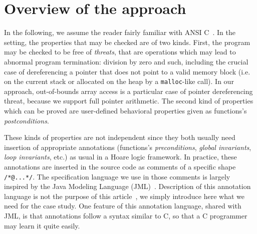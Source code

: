 \section{Overview of the \caduceus{} approach}
\label{sec:overview}

In the following, we assume the reader fairly familiar with ANSI
C~\cite{KR88}.  In the \caduceus{} setting, the properties that may be
checked are of two kinds. First, the program may be checked to be free
of \emph{threats}, that are operations which may lead to abnormal
program termination: division by zero and such, including the crucial
case of dereferencing a pointer that does not point to a valid memory
block (i.e. on the current stack or allocated on the heap by a
\texttt{malloc}-like call). In our approach, out-of-bounds array
access is a particular case of pointer dereferencing threat, because
we support full pointer arithmetic.  The second kind of properties
which can be proved are user-defined behavioral properties given as
functions's \emph{postconditions}.

These kinds of properties are not independent since they both usually
need insertion of appropriate annotations (functions's
\emph{preconditions}, \emph{global invariants}, \emph{loop
  invariants}, etc.) as usual in a Hoare logic framework.  In
practice, these annotations are inserted in the source code as
comments of a specific shape \verb!/*@...*/!. The specification
language we use in those comments is largely inspired by the Java
Modeling Language (JML)~\cite{leavens00jml}. 
Description of this annotation
language is not the purpose of this article~\cite{Caduceus,filliatre04icfem}, we simply
introduce here what we need for the case study.  One feature of this
annotation language, shared with JML, is that annotations follow
a syntax similar to C, so that a C programmer may learn it
quite easily.
 
